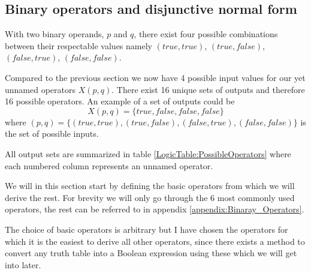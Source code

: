                  
\newpage        
        \subsection{Binary operators and disjunctive normal form}\label{DNF}
        
            With two binary operands, $p$ and $q$, there exist four possible combinations between their respectable values namely $(true, true)$, $(true, false)$, $(false, true)$, $(false, false)$.
            
            Compared to the previous section we now have 4 possible input values for our yet unnamed operators $X(p, q)$. There exist 16 unique sets of outputs and therefore 16 possible operators. An example of a set of outputs could be 
            \begin{equation}
                X(p, q) =\{true, false, false, false\}
            \end{equation}
            where $(p, q) = \{(true, true), (true, false), (false, true), (false, false)\}$ is the set of possible inputs. 
            
            All output sets are summarized in table \ref{LogicTable:PossibleOperators} where each numbered column represents an unnamed operator. 
            
            We will in this section start by defining the basic operators from which we will derive the rest. For brevity we will only go through the 6 most commonly used operators, the rest can be referred to in appendix \ref{appendix:Binaray_Operators}.  
            
            The choice of basic operators is arbitrary but I have chosen the operators for which it is the easiest to derive all other operators, since there exists a method to convert any truth table into a Boolean expression using these which we will get into later.
             
